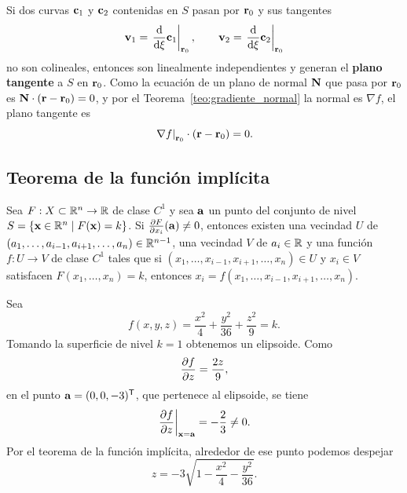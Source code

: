 Si dos curvas $\mathbf{c}_1$ y $\mathbf{c}_2$ contenidas en $S$ pasan por
$\mathbf{r}_0$ y sus tangentes
\begin{equation}
  \label{eq:tangentes_curvas}
  \mathbf{v}_1=\left. \frac{\mathrm{d}}{\mathrm{d}\xi}\mathbf{c}_1 \right|_{\mathbf{r}_0},
  \qquad
  \mathbf{v}_2=\left. \frac{\mathrm{d}}{\mathrm{d}\xi}\mathbf{c}_2 \right|_{\mathbf{r}_0}
\end{equation}
no son colineales, entonces son linealmente independientes y generan el
\textbf{plano tangente} a $S$ en $\mathbf{r}_0$. Como la ecuaci\'on de un plano de
normal $\mathbf{N}$ que pasa por $\mathbf{r}_0$ es
$\mathbf{N}\cdot(\mathbf{r}-\mathbf{r}_0)=0$, y por el
Teorema~\ref{teo:gradiente_normal} la normal es $\nabla f$, el plano tangente
es
\begin{equation}
  \label{eq:plano_tangente}
  \left. \nabla f \right|_{\mathbf{r}_0}\cdot\left( \mathbf{r}-\mathbf{r}_0 \right)=0 .
\end{equation}

\subsection{Teorema de la funci\'on impl\'icita}
\label{subsec:funcion_implicita}

\begin{teorema}
  \label{teo:funcion_implicita}
  Sea $F:X\subset\mathbb{R}^n\rightarrow\mathbb{R}$ de clase $C^1$ y sea $\mathbf{a}$ un punto del
  conjunto de nivel
  $S=\left\{ \mathbf{x}\in\mathbb{R}^n\mid F(\mathbf{x})=k \right\}$. Si
  $\frac{\partial F}{\partial x_i}(\mathbf{a})\neq 0$, entonces existen una vecindad $U$ de
  $(a_1,\dots,a_{i-1},a_{i+1},\dots,a_n)\in\mathbb{R}^{n-1}$, una vecindad $V$ de
  $a_i\in\mathbb{R}$ y una funci\'on $f:U\rightarrow V$ de clase $C^1$ tales que si
  $(x_1,\dots,x_{i-1},x_{i+1},\dots,x_n)\in U$ y $x_i\in V$ satisfacen
  $F(x_1,\dots,x_n)=k$, entonces
  $x_i=f(x_1,\dots,x_{i-1},x_{i+1},\dots,x_n)$.
\end{teorema}

\begin{ejemplo}
  \label{ej:elipsoide_implicita}
  Sea
  \begin{equation}
    \label{eq:elipsoide_nivel}
    f(x,y,z)=\frac{x^2}{4}+\frac{y^2}{36}+\frac{z^2}{9}=k .
  \end{equation}
  Tomando la superficie de nivel $k=1$ obtenemos un elipsoide. Como
  \begin{equation}
    \label{eq:parcial_elipsoide}
    \frac{\partial f}{\partial z}=\frac{2z}{9},
  \end{equation}
  en el punto $\mathbf{a}=(0,0,-3)^{\mathsf{T}}$, que pertenece al elipsoide, se tiene
  \begin{equation}
    \label{eq:parcial_elipsoide_a}
    \left. \frac{\partial f}{\partial z} \right|_{\mathbf{x}=\mathbf{a}}=-\frac{2}{3}\neq 0 .
  \end{equation}
  Por el teorema de la funci\'on impl\'icita, alrededor de ese punto podemos
  despejar
  \begin{equation}
    \label{eq:despeje_z}
    z=-3\sqrt{1-\frac{x^2}{4}-\frac{y^2}{36}} .
  \end{equation}
\end{ejemplo}


